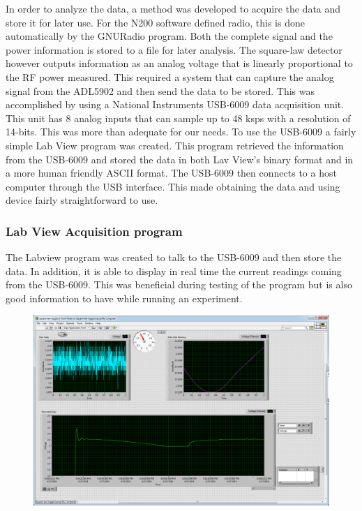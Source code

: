 In order to analyze the data, a method was developed to acquire the data and store it for later use.  For the N200 software defined radio, this is done automatically by the GNURadio program.  Both the complete signal and the power information is stored to a file for later analysis.  The square-law detector however outputs information as an analog voltage that is linearly proportional to the RF power measured.  This required a system that can capture the analog signal from the ADL5902 and then send the data to be stored.  This was accomplished by using a National Instruments USB-6009 data acquisition unit.  This unit has 8 analog inputs that can sample up to 48 ksps with a resolution of 14-bits.  This was more than adequate for our needs.  To use the USB-6009 a fairly simple Lab View program was created.  This program retrieved the information from the USB-6009 and stored the data in both Lav View's binary format and in a more human friendly ASCII format.  The USB-6009 then connects to a host computer through the USB interface.  This made obtaining the data and using device fairly straightforward to use.

\subsubsection{Lab View Acquisition program}

The Labview program was created to talk to the USB-6009 and then store the data.  In addition, it is able to display in real time the current readings coming from the USB-6009.  This was beneficial during testing of the program but is also good information to have while running an experiment.  

{\begin{figure}[h!tb] \centering
\includegraphics[width=\textwidth]{Images/labviewGUI.png}
\label{labviewgui}
\end{figure}
}

